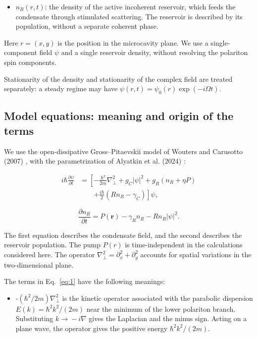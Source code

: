\documentclass[12pt,a4paper]{article}
\begin{document}
\begin{itemize}\setlength{\itemsep}{3pt}\item $n_{R}(r,t)$: the density of the active incoherent reservoir, which feeds the condensate through stimulated scattering. The reservoir is described by its population, without a separate coherent phase.\end{itemize}

Here $r=(x,y)$ is the position in the microcavity plane. We use a single-component field $\psi$ and a single reservoir density, without resolving the polariton spin components.

Stationarity of the density and stationarity of the complex field are treated separately: a steady regime may have $\psi(r,t)=\psi_{0}(r)\exp(-i \Omega t)$.

\subsection{Model equations: meaning and origin of the terms}\label{sec:2.2}

We use the open-dissipative Gross--Pitaevskii model of Wouters and Carusotto (2007) \cite{ref1}, with the parametrization of Alyatkin et al. (2024) \cite{ref3}:

\begin{equation}\label{eq:1}
\begin{aligned}
i\hbar\frac{\partial\psi}{\partial t}
&=\left[-\frac{\hbar^2}{2m}\nabla_\perp^2
+g_C|\psi|^2+g_R(n_R+\eta P)\right.\\
&\qquad\left.+\frac{i\hbar}{2}(Rn_R-\gamma_C)\right]\psi ,
\end{aligned}\end{equation}

\begin{equation}\label{eq:2}
\frac{\partial n_R}{\partial t}=P(\mathbf r)-\gamma_R n_R-Rn_R|\psi|^2.\end{equation}

The first equation describes the condensate field, and the second describes the reservoir population. The pump $P(r)$ is time-independent in the calculations considered here. The operator $\nabla_\perp^{2}=\partial_{x}^{2}+\partial_{y}^{2}$ accounts for spatial variations in the two-dimensional plane.

The terms in Eq.~\eqref{eq:1} have the following meanings:

\begin{itemize}\setlength{\itemsep}{3pt}\item -$(\hbar^{2}/2m) \nabla_\perp^{2}$ is the kinetic operator associated with the parabolic dispersion $E(k)=\hbar^{2} k^{2}/(2m)$ near the minimum of the lower polariton branch. Substituting $k\to{}-i \nabla$ gives the Laplacian and the minus sign. Acting on a plane wave, the operator gives the positive energy $\hbar^{2} k^{2}/(2m)$.\end{itemize}
\end{document}
